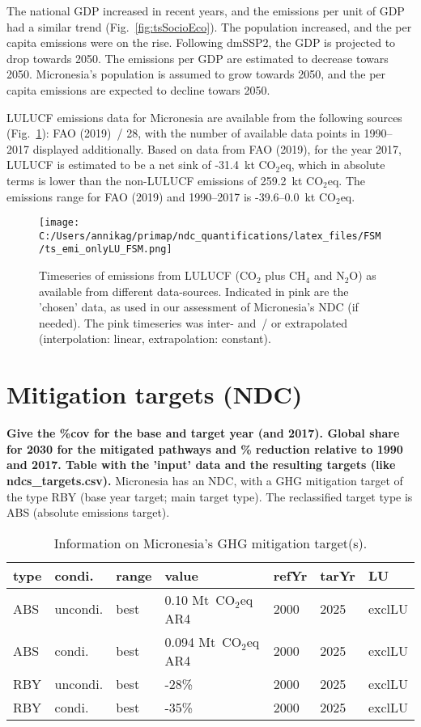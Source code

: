 \documentclass[12pt]{article}
\begin{document}
 The national GDP increased in recent years, and the emissions per unit of GDP had a similar trend (Fig.~\ref{fig:tsSocioEco}).
 The population increased, and the per capita emissions were on the rise. 
 Following dmSSP2, the GDP is projected to drop towards 2050. 
 The emissions per GDP are estimated to decrease towars 2050. 
 Micronesia's population is assumed to grow towards 2050, and the per capita emissions are expected to decline towars 2050. 

 LULUCF emissions data for Micronesia are available from the following sources (Fig.~\ref{fig:tsLULUCF}): FAO (2019)~/ 28, with the number of available data points in 1990--2017 displayed additionally.
 Based on data from FAO (2019), for the year 2017, LULUCF is estimated to be a net sink of -31.4~kt CO$_2$eq, which in absolute terms is lower than the non-LULUCF emissions of 259.2~kt CO$_2$eq.
 The emissions range for FAO (2019) and 1990--2017 is -39.6--0.0~kt CO$_2$eq.

 \begin{figure}[H]
 \centering
 \texttt{[image: C:/Users/annikag/primap/ndc\_quantifications/latex\_files/FSM/ts\_emi\_onlyLU\_FSM.png]}
 \caption{Timeseries of emissions from LULUCF (CO$_2$ plus CH$_4$ and N$_2$O) as available from different data-sources. 
 Indicated in pink are the 'chosen' data, as used in our assessment of Micronesia's NDC (if needed). 
 The pink timeseries was inter- and~/ or extrapolated (interpolation: linear, extrapolation: constant).}
 \label{fig:tsLULUCF}
 \end{figure}

 \newpage %
 \section{Mitigation targets (NDC)}
 \label{sec:mitiTars}

 \textbf{ 
 Give the \%cov for the base and target year (and 2017). \newline
 Global share for 2030 for the mitigated pathways and \% reduction relative to 1990 and 2017. \newline
 Table with the 'input' data and the resulting targets (like ndcs\_targets.csv). \newline}
 Micronesia has an NDC, with a GHG mitigation target of the type RBY (base year target; main target type).
 The reclassified target type is ABS (absolute emissions target).

 \begin{table}[H]
 \centering
 \caption{Information on Micronesia's GHG mitigation target(s).}
 \label{tab:mitiTars}
 \begin{tabular}{l l l l l l l }
 \bfseries type & \bfseries condi. & \bfseries range & \bfseries value & \bfseries refYr & \bfseries tarYr & \bfseries LU \tabularnewline \hline \hline
 ABS & uncondi. & best & 0.10 Mt~CO$_2$eq AR4 & 2000 & 2025 & exclLU \tabularnewline 
 ABS & condi. & best & 0.094 Mt~CO$_2$eq AR4 & 2000 & 2025 & exclLU \tabularnewline \hline
 RBY & uncondi. & best & -28\% & 2000 & 2025 & exclLU \tabularnewline 
 RBY & condi. & best & -35\% & 2000 & 2025 & exclLU \tabularnewline 
 \end{tabular}
 \end{table}
\end{document}
